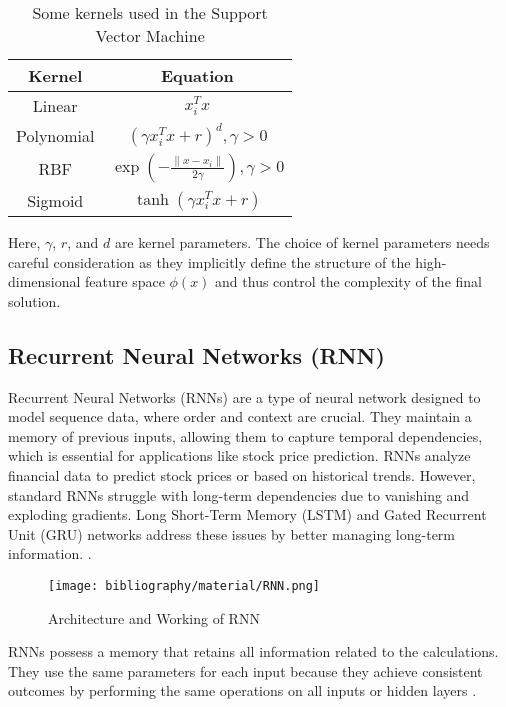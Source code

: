 \documentclass{ieeeojies}
\begin{document}
	\begin{table}[H]
		\centering
		\caption{Some kernels used in the Support Vector Machine}
		\begin{tabular}{|c|c|}
			\hline
			\textbf{Kernel} & \textbf{Equation} \\ \hline
			Linear & ${x_i^T x}$ \\ \hline
			Polynomial & $(\gamma x_i^T x + r)^d, \gamma > 0$ \\ \hline
			RBF & $\exp \left( - \frac{\|x - x_i\|}{2\gamma} \right),  \gamma > 0$ \\ \hline
			Sigmoid & $\tanh(\gamma x_i^T x + r)$ \\ \hline
		\end{tabular}
	\end{table}
 Here, \( \gamma \), \( r \), and \( d \) are kernel parameters. The choice of kernel parameters needs careful consideration as they implicitly define the structure of the high-dimensional feature space \( \phi(x) \) and thus control the complexity of the final solution.

	\subsection{Recurrent Neural Networks (RNN)}
	Recurrent Neural Networks (RNNs) are a type of neural network designed to model sequence data, where order and context are crucial. They maintain a memory of previous inputs, allowing them to capture temporal dependencies, which is essential for applications like stock price prediction. RNNs analyze financial data to predict stock prices or based on historical trends. However, standard RNNs struggle with long-term dependencies due to vanishing and exploding gradients. Long Short-Term Memory (LSTM) and Gated Recurrent Unit (GRU) networks address these issues by better managing long-term  information. \cite{b11}.
	\begin{figure}[H] %
		\centering
		\texttt{[image: bibliography/material/RNN.png]}
		\caption{Architecture and Working of RNN}
	\end{figure}
	\noindent RNNs possess a memory that retains all information related to the calculations. They use the same parameters for each input because they achieve consistent outcomes by performing the same operations on all inputs or hidden layers \cite{b12}.
	
\end{document}
